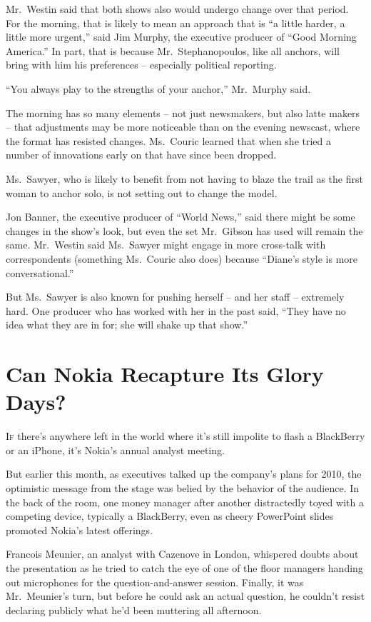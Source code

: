 ﻿\documentclass[12pt]{article}
\begin{document}
Mr.~Westin said that both shows also would undergo change over that period. For the morning, that is
likely to mean an approach that is ``a little harder, a little more urgent,'' said Jim Murphy, the
executive producer of ``Good Morning America.'' In part, that is because Mr.~Stephanopoulos, like
all anchors, will bring with him his preferences -- especially political reporting.

``You always play to the strengths of your anchor,'' Mr.~Murphy said.

The morning has so many elements -- not just newsmakers, but also latte makers -- that adjustments
may be more noticeable than on the evening newscast, where the format has resisted changes.
Ms.~Couric learned that when she tried a number of innovations early on that have since been
dropped.

Ms.~Sawyer, who is likely to benefit from not having to blaze the trail as the first woman to anchor
solo, is not setting out to change the model.

Jon Banner, the executive producer of ``World News,'' said there might be some changes in the show's
look, but even the set Mr.~Gibson has used will remain the same. Mr.~Westin said Ms.~Sawyer might
engage in more cross-talk with correspondents (something Ms.~Couric also does) because ``Diane's
style is more conversational.''

But Ms.~Sawyer is also known for pushing herself -- and her staff -- extremely hard. One producer
who has worked with her in the past said, ``They have no idea what they are in for; she will shake
up that show.''

\section{Can Nokia Recapture Its Glory Days?}

\lettrine{I}{f} there's anywhere left in the world where it's still impolite
to flash a BlackBerry or an iPhone, it's Nokia's annual analyst meeting.

But earlier this month, as executives talked up the company's plans for 2010, the optimistic message
from the stage was belied by the behavior of the audience. In the back of the room, one money
manager after another distractedly toyed with a competing device, typically a BlackBerry, even as
cheery PowerPoint slides promoted Nokia's latest offerings.

Francois Meunier, an analyst with Cazenove in London, whispered doubts about the presentation as he
tried to catch the eye of one of the floor managers handing out microphones for the
question-and-answer session. Finally, it was Mr.~Meunier's turn, but before he could ask an actual
question, he couldn't resist declaring publicly what he'd been muttering all afternoon.
\end{document}
